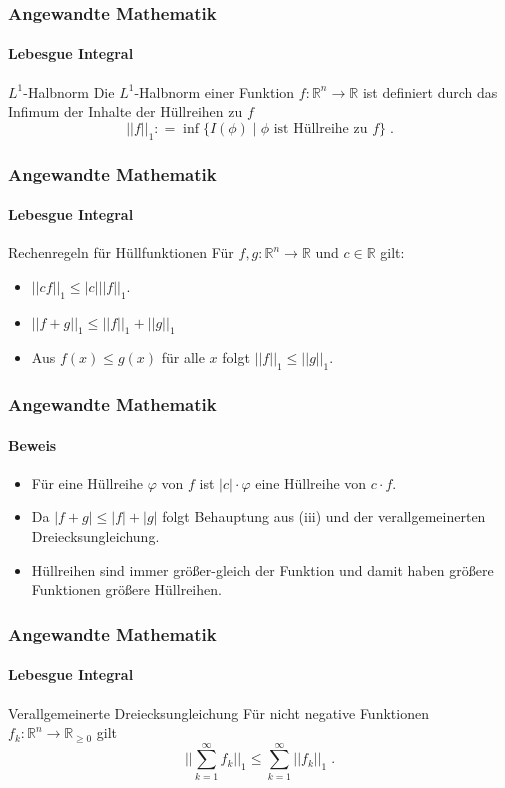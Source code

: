 \documentclass{beamer}
\begin{document}
\begin{frame}
    \frametitle{Angewandte Mathematik}
\framesubtitle{Lebesgue Integral}
    \begin{block}{ $L^1$-Halbnorm }
Die $L^1$-Halbnorm einer Funktion $f :\mathbb{R}^n \to \mathbb{R}$ ist definiert durch das Infimum der Inhalte der Hüllreihen zu $f$
$$ || f ||_1 : = \inf  \biggl \{   I(\phi) \; | \; \phi  \text{ ist Hüllreihe zu  }  f \biggr \} \; .$$
\end{block}

 \end{frame}






\begin{frame}
    \frametitle{Angewandte Mathematik}
\framesubtitle{Lebesgue Integral}
    \begin{block}{Rechenregeln für Hüllfunktionen}
Für $f,g : \mathbb{R}^n \to \mathbb{R}$ und $c \in \mathbb{R}$ gilt:
 \begin{itemize}
\item $|| cf ||_1 \leq |c| || f ||_1$. 
\item $|| f +g ||_1 \leq  ||f ||_1 + ||g||_1$
\item Aus $f (x) \leq g(x)$ für alle $x$ folgt $|| f ||_1 \leq || g ||_1$.
\end{itemize}

\end{block}
 \end{frame}


\begin{frame}
    \frametitle{Angewandte Mathematik}
\framesubtitle{Beweis}
 \begin{itemize}
\item Für eine Hüllreihe $\varphi$ von $f$ ist $|c| \cdot \varphi$ eine Hüllreihe von $c \cdot f$. 
\item Da $|f +g | \leq | f | + | g |$ folgt Behauptung aus (iii) und der verallgemeinerten Dreiecksungleichung.
\item Hüllreihen sind immer größer-gleich der Funktion und damit haben größere Funktionen größere Hüllreihen.
\end{itemize}
 \end{frame}



\begin{frame}
    \frametitle{Angewandte Mathematik}
\framesubtitle{Lebesgue Integral}
    \begin{block}{Verallgemeinerte Dreiecksungleichung}
Für nicht negative Funktionen $f_k  :\mathbb{R}^n \to \mathbb{R}_{\geq 0}$ gilt
$$ \biggl | \biggl | \sum_{k=1}^{\infty} f_k \biggr | \biggr |_1 \leq  \sum_{k=1}^{\infty} || f_k  ||_1 \; .$$
\end{block}

 \end{frame}
\end{document}
